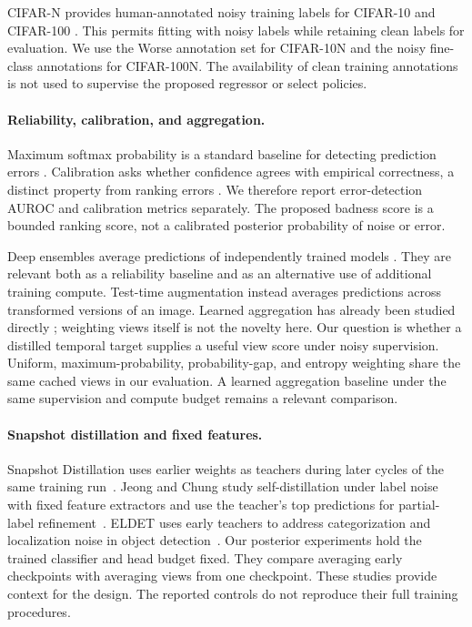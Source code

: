 CIFAR-N provides human-annotated noisy training labels for CIFAR-10 and CIFAR-100 \citep{wei2022noisy}. This permits fitting with noisy labels while retaining clean labels for evaluation. We use the Worse annotation set for CIFAR-10N and the noisy fine-class annotations for CIFAR-100N. The availability of clean training annotations is not used to supervise the proposed regressor or select policies.

\paragraph{Reliability, calibration, and aggregation.}
Maximum softmax probability is a standard baseline for detecting prediction errors \citep{hendrycks2016baseline}. Calibration asks whether confidence agrees with empirical correctness, a distinct property from ranking errors \citep{guo2017calibration}. We therefore report error-detection AUROC and calibration metrics separately. The proposed badness score is a bounded ranking score, not a calibrated posterior probability of noise or error.

Deep ensembles average predictions of independently trained models \citep{lakshminarayanan2017simple}. They are relevant both as a reliability baseline and as an alternative use of additional training compute. Test-time augmentation instead averages predictions across transformed versions of an image. Learned aggregation has already been studied directly \citep{shanmugam2021aggregation}; weighting views itself is not the novelty here. Our question is whether a distilled temporal target supplies a useful view score under noisy supervision. Uniform, maximum-probability, probability-gap, and entropy weighting share the same cached views in our evaluation. A learned aggregation baseline under the same supervision and compute budget remains a relevant comparison.


\paragraph{Snapshot distillation and fixed features.}
Snapshot Distillation uses earlier weights as teachers during later
cycles of the same training run~\citep{yang2019snapshot}. Jeong and Chung
study self-distillation under label noise with fixed feature extractors
and use the teacher's top predictions for partial-label
refinement~\citep{jeong2025rethinking}. ELDET uses early teachers to address
categorization and localization noise in object detection~\citep{choi2025eldet}.
Our posterior experiments hold the trained classifier and head budget
fixed. They compare averaging early checkpoints with averaging views
from one checkpoint. These studies provide context for the design. The
reported controls do not reproduce their full training procedures.
